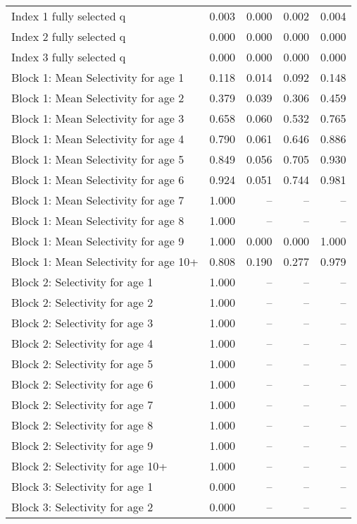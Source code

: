 \documentclass[
]{article}
\begin{document}
\begin{landscape}
\begin{longtable}[t]{lrrrr}
\endfoot
\bottomrule
\endlastfoot
Index 1 fully selected q & 0.003 & 0.000 & 0.002 & 0.004\\
Index 2 fully selected q & 0.000 & 0.000 & 0.000 & 0.000\\
Index 3 fully selected q & 0.000 & 0.000 & 0.000 & 0.000\\
Block 1: Mean Selectivity for age 1 & 0.118 & 0.014 & 0.092 & 0.148\\
Block 1: Mean Selectivity for age 2 & 0.379 & 0.039 & 0.306 & 0.459\\
\addlinespace
Block 1: Mean Selectivity for age 3 & 0.658 & 0.060 & 0.532 & 0.765\\
Block 1: Mean Selectivity for age 4 & 0.790 & 0.061 & 0.646 & 0.886\\
Block 1: Mean Selectivity for age 5 & 0.849 & 0.056 & 0.705 & 0.930\\
Block 1: Mean Selectivity for age 6 & 0.924 & 0.051 & 0.744 & 0.981\\
Block 1: Mean Selectivity for age 7 & 1.000 & -- & -- & --\\
\addlinespace
Block 1: Mean Selectivity for age 8 & 1.000 & -- & -- & --\\
Block 1: Mean Selectivity for age 9 & 1.000 & 0.000 & 0.000 & 1.000\\
Block 1: Mean Selectivity for age 10+ & 0.808 & 0.190 & 0.277 & 0.979\\
Block 2: Selectivity for age 1 & 1.000 & -- & -- & --\\
Block 2: Selectivity for age 2 & 1.000 & -- & -- & --\\
\addlinespace
Block 2: Selectivity for age 3 & 1.000 & -- & -- & --\\
Block 2: Selectivity for age 4 & 1.000 & -- & -- & --\\
Block 2: Selectivity for age 5 & 1.000 & -- & -- & --\\
Block 2: Selectivity for age 6 & 1.000 & -- & -- & --\\
Block 2: Selectivity for age 7 & 1.000 & -- & -- & --\\
\addlinespace
Block 2: Selectivity for age 8 & 1.000 & -- & -- & --\\
Block 2: Selectivity for age 9 & 1.000 & -- & -- & --\\
Block 2: Selectivity for age 10+ & 1.000 & -- & -- & --\\
Block 3: Selectivity for age 1 & 0.000 & -- & -- & --\\
Block 3: Selectivity for age 2 & 0.000 & -- & -- & --\\

\end{longtable}
\end{landscape}
\end{document}
